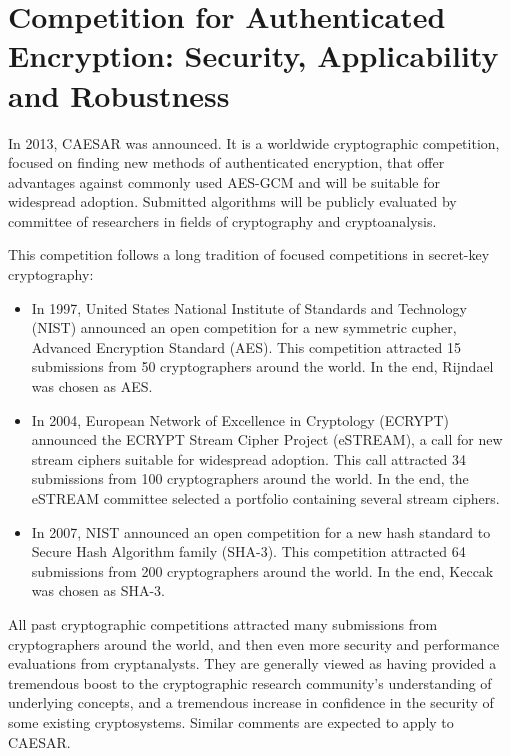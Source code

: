 \chapter{Competition for Authenticated Encryption: Security, Applicability and Robustness}
\label{toc/caesar}

In 2013, CAESAR was announced. It is a worldwide cryptographic competition, focused on finding new methods of authenticated encryption, that offer advantages against commonly used AES-GCM and will be suitable for widespread adoption. Submitted algorithms will be publicly evaluated by committee of researchers in fields of cryptography and cryptoanalysis.

This competition follows a long tradition of focused competitions in secret-key cryptography:

\begin{itemize}
  \item In 1997, United States National Institute of Standards and Technology (NIST) announced an open competition for a new symmetric cupher, Advanced Encryption Standard (AES). This competition attracted 15 submissions from 50 cryptographers around the world. In the end, Rijndael was chosen as AES.
  \item In 2004, European Network of Excellence in Cryptology (ECRYPT) announced the ECRYPT Stream Cipher Project (eSTREAM), a call for new stream ciphers suitable for widespread adoption. This call attracted 34 submissions from 100 cryptographers around the world. In the end, the eSTREAM committee selected a portfolio containing several stream ciphers.
  \item In 2007, NIST announced an open competition for a new hash standard to Secure Hash Algorithm family (SHA-3). This competition attracted 64 submissions from 200 cryptographers around the world. In the end, Keccak was chosen as SHA-3.
\end{itemize}

All past cryptographic competitions attracted many submissions from cryptographers around the world, and then even more security and performance evaluations from cryptanalysts. They are generally viewed as having provided a tremendous boost to the cryptographic research community's understanding of underlying concepts, and a tremendous increase in confidence in the security of some existing cryptosystems. Similar comments are expected to apply to CAESAR. \cite{crypto-competitions}





